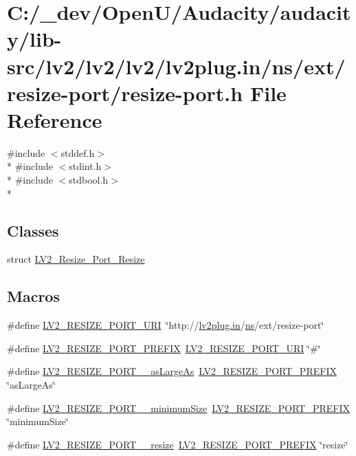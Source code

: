 \hypertarget{resize-port_8h}{}\section{C\+:/\+\_\+dev/\+Open\+U/\+Audacity/audacity/lib-\/src/lv2/lv2/lv2/lv2plug.in/ns/ext/resize-\/port/resize-\/port.h File Reference}
\label{resize-port_8h}
{\ttfamily \#include $<$stddef.\+h$>$}\\*
{\ttfamily \#include $<$stdint.\+h$>$}\\*
{\ttfamily \#include $<$stdbool.\+h$>$}\\*
\subsection*{Classes}
\begin{DoxyCompactItemize}
\item 
struct \hyperlink{struct_l_v2___resize___port___resize}{L\+V2\+\_\+\+Resize\+\_\+\+Port\+\_\+\+Resize}
\end{DoxyCompactItemize}
\subsection*{Macros}
\begin{DoxyCompactItemize}
\item 
\#define \hyperlink{resize-port_8h_a3e1fd289a7fe551916ee4f6050486c0a}{L\+V2\+\_\+\+R\+E\+S\+I\+Z\+E\+\_\+\+P\+O\+R\+T\+\_\+\+U\+RI}~\char`\"{}http\+://\hyperlink{latency_8c_a7d946209d777cb95fe30364b8d321207}{lv2plug.\+in}/\hyperlink{xmltok_8c_ab6aec1346fb6c7b2733f0f73c9536ad2}{ns}/ext/resize-\/port\char`\"{}
\item 
\#define \hyperlink{resize-port_8h_a9a82350b72ac5f65909c5beaffe8c80e}{L\+V2\+\_\+\+R\+E\+S\+I\+Z\+E\+\_\+\+P\+O\+R\+T\+\_\+\+P\+R\+E\+F\+IX}~\hyperlink{resize-port_8h_a3e1fd289a7fe551916ee4f6050486c0a}{L\+V2\+\_\+\+R\+E\+S\+I\+Z\+E\+\_\+\+P\+O\+R\+T\+\_\+\+U\+RI} \char`\"{}\#\char`\"{}
\item 
\#define \hyperlink{resize-port_8h_ab1a08f5819bb23fa4d3bd726d59df662}{L\+V2\+\_\+\+R\+E\+S\+I\+Z\+E\+\_\+\+P\+O\+R\+T\+\_\+\+\_\+as\+Large\+As}~\hyperlink{resize-port_8h_a9a82350b72ac5f65909c5beaffe8c80e}{L\+V2\+\_\+\+R\+E\+S\+I\+Z\+E\+\_\+\+P\+O\+R\+T\+\_\+\+P\+R\+E\+F\+IX} \char`\"{}as\+Large\+As\char`\"{}
\item 
\#define \hyperlink{resize-port_8h_a454a28095cf5f09f82ccf614e5f0119b}{L\+V2\+\_\+\+R\+E\+S\+I\+Z\+E\+\_\+\+P\+O\+R\+T\+\_\+\+\_\+minimum\+Size}~\hyperlink{resize-port_8h_a9a82350b72ac5f65909c5beaffe8c80e}{L\+V2\+\_\+\+R\+E\+S\+I\+Z\+E\+\_\+\+P\+O\+R\+T\+\_\+\+P\+R\+E\+F\+IX} \char`\"{}minimum\+Size\char`\"{}
\item 
\#define \hyperlink{resize-port_8h_a184010c7f0c3671f5b75ac4760627b40}{L\+V2\+\_\+\+R\+E\+S\+I\+Z\+E\+\_\+\+P\+O\+R\+T\+\_\+\+\_\+resize}~\hyperlink{resize-port_8h_a9a82350b72ac5f65909c5beaffe8c80e}{L\+V2\+\_\+\+R\+E\+S\+I\+Z\+E\+\_\+\+P\+O\+R\+T\+\_\+\+P\+R\+E\+F\+IX} \char`\"{}resize\char`\"{}
\end{DoxyCompactItemize}
